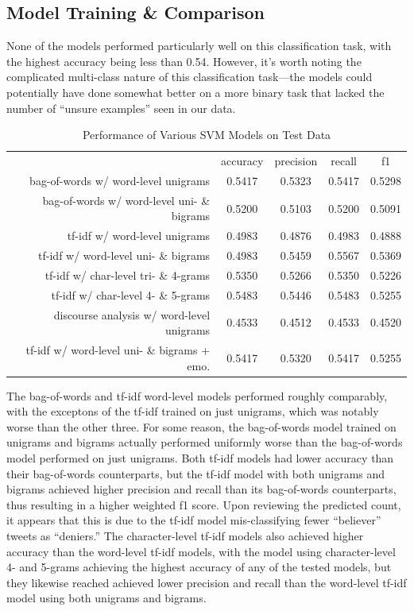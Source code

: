 \documentclass[article,oneside,a4paper,12pt]{memoir}
\begin{document}
\subsection{Model Training \& Comparison}

None of the models performed particularly well on this classification task, with the highest accuracy being less than 0.54. However, it's worth noting the complicated multi-class nature of this classification task---the models could potentially have done somewhat better on a more binary task that lacked the number of ``unsure examples'' seen in our data.

\begin{table}[htb]
    \centering
    \begin{tabular}{@{}rcccc@{}}
    \toprule
     & accuracy & precision & recall & f1 \\ \cmidrule(l){2-5} 
    bag-of-words w/ word-level unigrams & 0.5417 & 0.5323 & 0.5417 & 0.5298 \\
    bag-of-words w/ word-level uni- \& bigrams & 0.5200 & 0.5103 & 0.5200 & 0.5091 \\
    tf-idf w/ word-level unigrams & 0.4983 & 0.4876 & 0.4983 & 0.4888 \\
    tf-idf w/ word-level uni- \& bigrams & 0.4983 & 0.5459 & 0.5567 & 0.5369 \\
    tf-idf w/ char-level tri- \& 4-grams & 0.5350 & 0.5266 & 0.5350 & 0.5226 \\
    tf-idf w/ char-level 4- \& 5-grams & 0.5483 & 0.5446 & 0.5483 & 0.5255 \\
    discourse analysis w/ word-level unigrams & 0.4533 & 0.4512 & 0.4533 & 0.4520 \\
    tf-idf w/ word-level uni- \& bigrams + emo. & 0.5417 & 0.5320 & 0.5417 & 0.5255 \\ \bottomrule
    \end{tabular}
    \caption{Performance of Various SVM Models on Test Data}
    \label{tab:results}
\end{table}

The bag-of-words and tf-idf word-level models performed roughly comparably, with the exceptons of the tf-idf trained on just unigrams, which was notably worse than the other three. For some reason, the bag-of-words model trained on unigrams and bigrams actually performed uniformly worse than the bag-of-words model performed on just unigrams. Both tf-idf models had lower accuracy than their bag-of-words counterparts, but the tf-idf model with both unigrams and bigrams achieved higher precision and recall than its bag-of-words counterparts, thus resulting in a higher weighted f1 score. Upon reviewing the predicted count, it appears that this is due to the tf-idf model mis-classifying fewer ``believer'' tweets as ``deniers.'' The character-level tf-idf models also achieved higher accuracy than the word-level tf-idf models, with the model using character-level 4- and 5-grams achieving the highest accuracy of any of the tested models, but they likewise reached achieved lower precision and recall than the word-level tf-idf model using both unigrams and bigrams.
\end{document}
